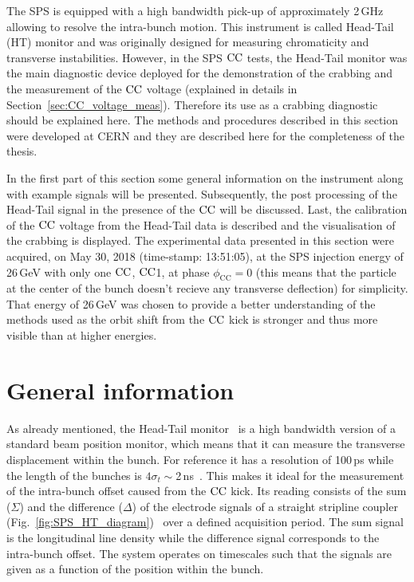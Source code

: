 The SPS is equipped with a high bandwidth pick-up of approximately 2\,GHz allowing to resolve the intra-bunch motion. This instrument is called Head-Tail (HT) monitor and was originally designed for measuring chromaticity and transverse instabilities. However, in the SPS ${\mathrm{CC}}$ tests, the Head-Tail monitor was the main diagnostic device deployed for the demonstration of the crabbing and the measurement of the ${\mathrm{CC}}$ voltage (explained in details in Section~\ref{sec:CC_voltage_meas}). Therefore its use as a crabbing diagnostic should be explained here. The methods and procedures described in this section were developed at CERN and they are described here for the completeness of the thesis.

In the first part of this section some general information on the instrument along with example signals will be presented. Subsequently, the post processing of the Head-Tail signal in the presence of the ${\mathrm{CC}}$ will be discussed. Last, the calibration of the ${\mathrm{CC}}$ voltage from the Head-Tail data is described and the visualisation of the crabbing is displayed. The experimental data presented in this section were acquired, on May 30, 2018 (time-stamp: 13:51:05), at the SPS injection energy of 26\,GeV with only one ${\mathrm{CC}}$, ${\mathrm{CC}}$1, at phase $\phi_\mathrm{CC}=0$ (this means that the particle at the center of the bunch doesn't recieve any transverse deflection) for simplicity. That energy of 26\,GeV was chosen to provide a better understanding of the methods used as the orbit shift from the ${\mathrm{CC}}$ kick is stronger and thus more visible than at higher energies.

\section{General information}\label{subsec:HT_general_info}
As already mentioned, the Head-Tail monitor~\cite{sps_headtail_monitor} is a high bandwidth version of a standard beam position monitor, which means that it can measure the transverse displacement within the bunch. For reference it has a resolution of 100\,ps while the length of the bunches is $4\sigma_t \sim $2\,ns~\cite{Carver:2696108}.  This makes it ideal for the measurement of the intra-bunch offset caused from the ${\mathrm{CC}}$ kick. Its reading consists of the sum ($\Sigma$) and the  difference ($\Delta$) of the electrode signals of a straight stripline coupler (Fig.~\ref{fig:SPS_HT_diagram})~\cite{Jones:987561, Levens:2313358} over a defined acquisition period. The sum signal is the longitudinal line density while the difference signal corresponds to the intra-bunch offset. The system operates on timescales such that the signals are given as a function of the position within the bunch.

